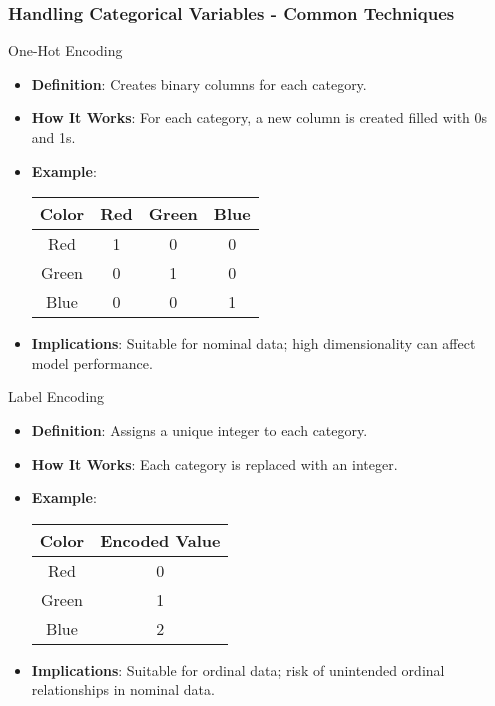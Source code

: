 \documentclass[aspectratio=169]{beamer}
\begin{document}
\begin{frame}[fragile]
    \frametitle{Handling Categorical Variables - Common Techniques}
    \begin{block}{One-Hot Encoding}
        \begin{itemize}
            \item \textbf{Definition}: Creates binary columns for each category.
            \item \textbf{How It Works}: For each category, a new column is created filled with 0s and 1s.
            \item \textbf{Example}:
            \begin{center}
                \begin{tabular}{|c|c|c|c|}
                    \hline
                    Color  & Red & Green & Blue \\
                    \hline
                    Red    & 1   & 0     & 0   \\
                    Green  & 0   & 1     & 0   \\
                    Blue   & 0   & 0     & 1   \\
                    \hline
                \end{tabular}
            \end{center}
            \item \textbf{Implications}: Suitable for nominal data; high dimensionality can affect model performance.
        \end{itemize}
    \end{block}

    \begin{block}{Label Encoding}
        \begin{itemize}
            \item \textbf{Definition}: Assigns a unique integer to each category.
            \item \textbf{How It Works}: Each category is replaced with an integer.
            \item \textbf{Example}:
            \begin{center}
                \begin{tabular}{|c|c|}
                    \hline
                    Color  & Encoded Value \\
                    \hline
                    Red    & 0              \\
                    Green  & 1              \\
                    Blue   & 2              \\
                    \hline
                \end{tabular}
            \end{center}
            \item \textbf{Implications}: Suitable for ordinal data; risk of unintended ordinal relationships in nominal data.
        \end{itemize}
    \end{block}
\end{frame}
\end{document}
